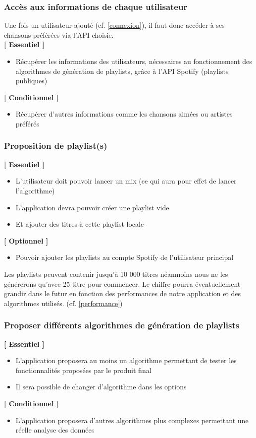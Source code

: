\documentclass{article}
\begin{document}
		\subsubsection{Accès aux informations de chaque utilisateur} 
		Une fois un utilisateur ajouté (cf. \ref{connexion}), il faut donc accéder à ses chansons préférées via l'API choisie. 
		\\
		\textbf{[ Essentiel ]}
		\begin{itemize}
			\item Récupérer les informations des utilisateurs, nécessaires au fonctionnement des algorithmes de génération de playlists, grâce à l'API Spotify (playlists publiques)
		\end{itemize}
		\textbf{[ Conditionnel ]}
		\begin{itemize}
			\item Récupérer d'autres informations comme les chansons aimées ou artistes préférés
		\end{itemize}
		\subsubsection{Proposition de playlist(s)}
		\textbf{[ Essentiel ]}
	      \begin{itemize}
	        \item L'utilisateur doit pouvoir lancer un mix (ce qui aura pour effet de lancer l'algorithme)
	      	\item L'application devra pouvoir créer une playlist vide
	      	\item Et ajouter des titres à cette playlist locale
	      \end{itemize}
  	    \textbf{[ Optionnel ]}
        \begin{itemize}
      	    \item Pouvoir ajouter les playlists au compte Spotify de l'utilisateur principal
        \end{itemize}
        Les playlists peuvent contenir jusqu'à 10 000 titres néanmoins nous ne les générerons qu'avec 25 titre pour commencer. Le chiffre pourra éventuellement grandir dans le futur en fonction des performances de notre application et des algorithmes utilisés. (cf. \ref{performance})
			        

		\subsubsection{Proposer différents algorithmes de génération de playlists}
	    \textbf{[ Essentiel ]}
		\begin{itemize}
			\item  L'application proposera au moins un algorithme \cite{ICDM2017} permettant de tester les fonctionnalités proposées par le produit final
			\item Il sera possible de changer d'algorithme dans les options
		\end{itemize}
	    \textbf{[ Conditionnel ]}
		\begin{itemize}
			\item  L'application proposera d'autres algorithmes \cite{ICDM2017} plus complexes permettant une réelle analyse des données
		\end{itemize}
		  
\end{document}

